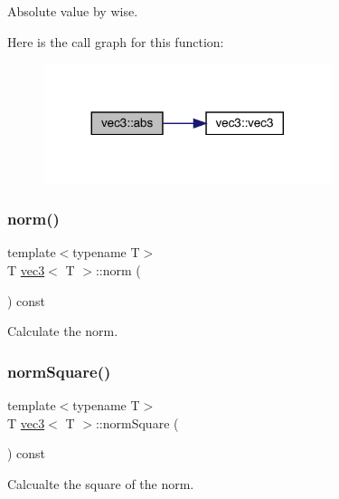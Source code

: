 Absolute value by wise. 

Here is the call graph for this function\+:\nopagebreak
\begin{figure}[H]
\begin{center}
\leavevmode
\includegraphics[width=239pt]{structvec3_abf0d30ac0a81beeacd36ddc86ec6ee83_cgraph}
\end{center}
\end{figure}
\mbox{\label{structvec3_a1bde56ffdf0b5915f9b2e75b56db63e8}} 
\subsubsection{\texorpdfstring{norm()}{norm()}}
{\footnotesize\ttfamily template$<$typename T$>$ \\
T \mbox{\hyperlink{structvec3}{vec3}}$<$ T $>$\+::norm (\begin{DoxyParamCaption}{ }\end{DoxyParamCaption}) const\hspace{0.3cm}{\ttfamily [inline]}}



Calculate the norm. 

\mbox{\label{structvec3_ab08eac50c74f6630a05a7fafed13dccc}} 
\subsubsection{\texorpdfstring{norm\+Square()}{normSquare()}}
{\footnotesize\ttfamily template$<$typename T$>$ \\
T \mbox{\hyperlink{structvec3}{vec3}}$<$ T $>$\+::norm\+Square (\begin{DoxyParamCaption}{ }\end{DoxyParamCaption}) const\hspace{0.3cm}{\ttfamily [inline]}}



Calcualte the square of the norm. 

